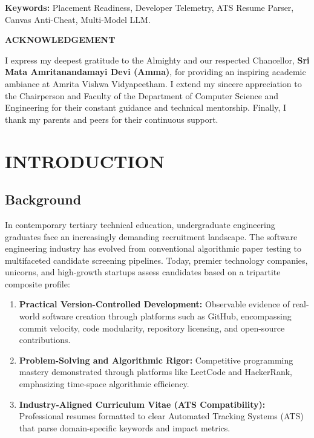\documentclass[12pt,a4paper]{report}
\begin{document}
\vspace{0.2cm}
\noindent \textbf{Keywords:} Placement Readiness, Developer Telemetry, ATS Resume Parser, Canvas Anti-Cheat, Multi-Model LLM.

\vspace{0.8cm}
\begin{center}
    {\Large \textbf{ACKNOWLEDGEMENT}}
\end{center}
\vspace{0.2cm}
I express my deepest gratitude to the Almighty and our respected Chancellor, \textbf{Sri Mata Amritanandamayi Devi (Amma)}, for providing an inspiring academic ambiance at Amrita Vishwa Vidyapeetham. I extend my sincere appreciation to the Chairperson and Faculty of the Department of Computer Science and Engineering for their constant guidance and technical mentorship. Finally, I thank my parents and peers for their continuous support.

\newpage
\tableofcontents

\newpage
\listoffigures
\vspace{0.8cm}
\listoftables

\newpage
{}
\setcounter{page}{1}


\chapter{INTRODUCTION}

\section{Background}
In contemporary tertiary technical education, undergraduate engineering graduates face an increasingly demanding recruitment landscape. The software engineering industry has evolved from conventional algorithmic paper testing to multifaceted candidate screening pipelines. Today, premier technology companies, unicorns, and high-growth startups assess candidates based on a tripartite composite profile:
\begin{enumerate}
    \item \textbf{Practical Version-Controlled Development:} Observable evidence of real-world software creation through platforms such as GitHub, encompassing commit velocity, code modularity, repository licensing, and open-source contributions.
    \item \textbf{Problem-Solving and Algorithmic Rigor:} Competitive programming mastery demonstrated through platforms like LeetCode and HackerRank, emphasizing time-space algorithmic efficiency.
    \item \textbf{Industry-Aligned Curriculum Vitae (ATS Compatibility):} Professional resumes formatted to clear Automated Tracking Systems (ATS) that parse domain-specific keywords and impact metrics.
\end{enumerate}
\end{document}
